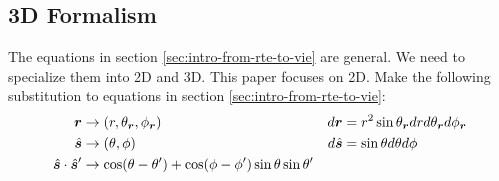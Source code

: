 \documentclass [10pt,letterpaper]{article}
\newcommand{\unitvectorsym}[1]{\hat{\vectorsym{#1}}}
\begin{document}
\subsection{3D Formalism}
The equations in section \ref{sec:intro-from-rte-to-vie} are general. We need to specialize them into 2D and 3D. This paper focuses on 2D.
Make the following substitution to equations in section \ref{sec:intro-from-rte-to-vie}:
\begin{align*}
	\vectorsym{r} & \rightarrow(r,\theta_{\vectorsym{r}},\phi_{\vectorsym{r}}) & d\vectorsym{r} &= r^2 \sin\theta_{\vectorsym{r}} dr d\theta_{\vectorsym{r}}d\phi_{\vectorsym{r}} \\
	\unitvectorsym{s} & \rightarrow(\theta,\phi) & d\unitvectorsym{s} &= \sin\theta d\theta d\phi \\
	\unitvectorsym{s}\cdot\unitvectorsym{s}^\prime & \rightarrow \cos(\theta-\theta^\prime)+\cos(\phi-\phi^\prime)\sin\theta\sin\theta^\prime & & 
\end{align*}
\end{document}
